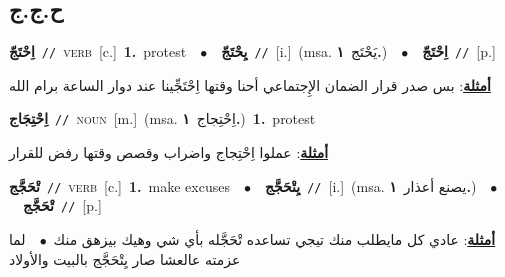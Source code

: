 \documentclass[10pt,a4paper,twoside]{article} %
\begin{document}
\begin{multicols}{2}
{{{{{{{{{{\vspace{-3mm}
\subsection*{\color{blue}\foreignlanguage{arabic}{ح.ج.ج}\color{blue}{}} 

{\setlength\topsep{0pt}\textbf{\foreignlanguage{arabic}{اِحْتَجّ}}\ {\color{gray}\texttt{//}\color{black}}\ \textsc{verb}\ [c.]\ \textbf{1.}~protest\ \ $\bullet$\ \ \setlength\topsep{0pt}\textbf{\foreignlanguage{arabic}{يِحْتَجّ}}\ {\color{gray}\texttt{//}\color{black}}\ [i.]\ \color{gray}(msa. \foreignlanguage{arabic}{يَحْتَج}~\foreignlanguage{arabic}{\textbf{١.}})\color{black}\ \ $\bullet$\ \ \setlength\topsep{0pt}\textbf{\foreignlanguage{arabic}{اِحْتَجّ}}\ {\color{gray}\texttt{//}\color{black}}\ [p.]\  \begin{flushright}\color{gray}\foreignlanguage{arabic}{\textbf{\underline{\foreignlanguage{arabic}{أمثلة}}}: بس صدر قرار الضمان الإِجتماعي أحنا وقتها اِحْتَجِّينا عند دوار الساعة برام الله}\end{flushright}\color{black}} \vspace{2mm}

{\setlength\topsep{0pt}\textbf{\foreignlanguage{arabic}{اِحْتِجَاج}}\ {\color{gray}\texttt{//}\color{black}}\ \textsc{noun}\ [m.]\ \color{gray}(msa. \foreignlanguage{arabic}{اِحْتِجاج}~\foreignlanguage{arabic}{\textbf{١.}})\color{black}\ \textbf{1.}~protest\  \begin{flushright}\color{gray}\foreignlanguage{arabic}{\textbf{\underline{\foreignlanguage{arabic}{أمثلة}}}: عملوا اِحْتِجاج واضراب وقصص وقتها رفض للقرار}\end{flushright}\color{black}} \vspace{2mm}

{\setlength\topsep{0pt}\textbf{\foreignlanguage{arabic}{تْحَجَّج}}\ {\color{gray}\texttt{//}\color{black}}\ \textsc{verb}\ [c.]\ \textbf{1.}~make excuses\ \ $\bullet$\ \ \setlength\topsep{0pt}\textbf{\foreignlanguage{arabic}{يِتْحَجَّج}}\ {\color{gray}\texttt{//}\color{black}}\ [i.]\ \color{gray}(msa. \foreignlanguage{arabic}{يصنع أعذار}~\foreignlanguage{arabic}{\textbf{١.}})\color{black}\ \ $\bullet$\ \ \setlength\topsep{0pt}\textbf{\foreignlanguage{arabic}{تْحَجَّج}}\ {\color{gray}\texttt{//}\color{black}}\ [p.]\  \begin{flushright}\color{gray}\foreignlanguage{arabic}{\textbf{\underline{\foreignlanguage{arabic}{أمثلة}}}: عادي كل مايطلب منك تيجي تساعده تْحَجَّله بأي شي وهيك بيزهق منك\ $\bullet$\ \  لما عزمته عالعشا صار يِتْحَجَّج بالبيت والأولاد}\end{flushright}\color{black}} \vspace{2mm}

}}}}}}}}}}
\end{multicols}
\end{document}
